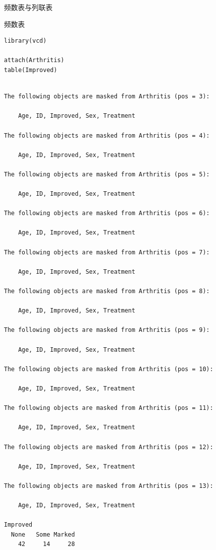 \documentclass[presentation]{beamer}
\begin{document}
\begin{frame}[fragile,label={sec:orgfab4d0a}]{频数表与列联表}
 \begin{block}{频数表}
\begin{verbatim}
library(vcd)

attach(Arthritis)
table(Improved)
\end{verbatim}

\begin{verbatim}

The following objects are masked from Arthritis (pos = 3):

    Age, ID, Improved, Sex, Treatment

The following objects are masked from Arthritis (pos = 4):

    Age, ID, Improved, Sex, Treatment

The following objects are masked from Arthritis (pos = 5):

    Age, ID, Improved, Sex, Treatment

The following objects are masked from Arthritis (pos = 6):

    Age, ID, Improved, Sex, Treatment

The following objects are masked from Arthritis (pos = 7):

    Age, ID, Improved, Sex, Treatment

The following objects are masked from Arthritis (pos = 8):

    Age, ID, Improved, Sex, Treatment

The following objects are masked from Arthritis (pos = 9):

    Age, ID, Improved, Sex, Treatment

The following objects are masked from Arthritis (pos = 10):

    Age, ID, Improved, Sex, Treatment

The following objects are masked from Arthritis (pos = 11):

    Age, ID, Improved, Sex, Treatment

The following objects are masked from Arthritis (pos = 12):

    Age, ID, Improved, Sex, Treatment

The following objects are masked from Arthritis (pos = 13):

    Age, ID, Improved, Sex, Treatment

Improved
  None   Some Marked 
    42     14     28
\end{verbatim}
\end{block}


\end{frame}
\end{document}
